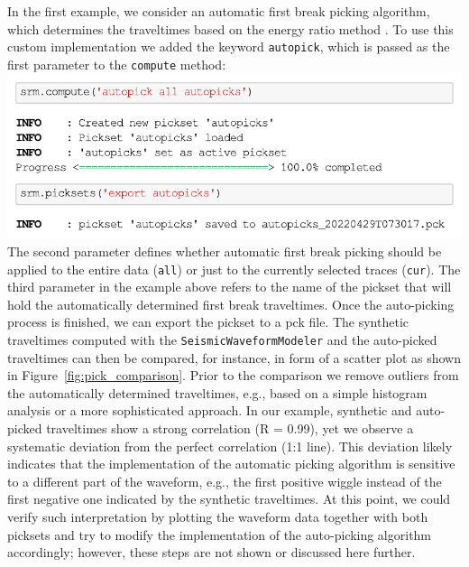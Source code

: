 \documentclass[a4paper,fleqn]{cas-sc}
\begin{document}
\clearpage
In the first example, we consider an automatic first break picking algorithm, which determines the traveltimes based on the energy ratio method \citep[e.g.,][]{earle1994}. To use this custom implementation we added the keyword \texttt{autopick}, which is passed as the first parameter to the \texttt{compute} method:
\newline
\includegraphics[width=.5\textwidth]{./figures/autopicking.pdf}
\newline
The second parameter defines whether automatic first break picking should be applied to the entire data (\texttt{all}) or just to the currently selected traces (\texttt{cur}). The third parameter in the example above refers to the name of the pickset that will hold the automatically determined first break traveltimes.
Once the auto-picking process is finished, we can export the pickset to a pck file.
The synthetic traveltimes computed with the \texttt{SeismicWaveformModeler} and the auto-picked traveltimes can then be compared, for instance, in form of a scatter plot as shown in Figure~\ref{fig:pick_comparison}. Prior to the comparison we remove outliers from the automatically determined traveltimes, e.g., based on a simple histogram analysis or a more sophisticated approach. In our example, synthetic and auto-picked traveltimes show a strong correlation (R = 0.99), yet we observe a systematic deviation from the perfect correlation (1:1 line). This deviation likely indicates that the implementation of the automatic picking algorithm is sensitive to a different part of the waveform, e.g., the first positive wiggle instead of the first negative one indicated by the synthetic traveltimes. At this point, we could verify such interpretation by plotting the waveform data together with both picksets and try to modify the implementation of the auto-picking algorithm accordingly; however, these steps are not shown or discussed here further.
\end{document}
